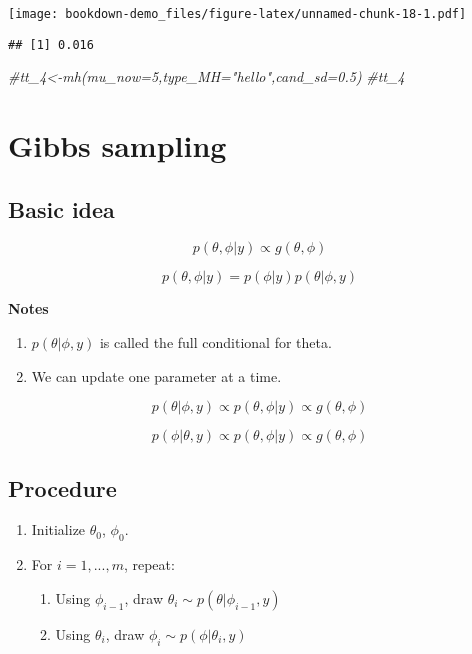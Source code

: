 \documentclass[]{book}
\newenvironment{Shaded}{\begin{snugshade}}{\end{snugshade}}
\newcommand{\DecValTok}[1]{\textcolor[rgb]{0.00,0.00,0.81}{#1}}
\newcommand{\CommentTok}[1]{\textcolor[rgb]{0.56,0.35,0.01}{\textit{#1}}}
\newcommand{\OperatorTok}[1]{\textcolor[rgb]{0.81,0.36,0.00}{\textbf{#1}}}
\newcommand{\NormalTok}[1]{#1}
\providecommand{\tightlist}{%
  \setlength{\itemsep}{0pt}\setlength{\parskip}{0pt}}
\begin{document}
\texttt{[image: bookdown-demo\_files/figure-latex/unnamed-chunk-18-1.pdf]}

\begin{Shaded}
\end{Shaded}

\begin{verbatim}
## [1] 0.016
\end{verbatim}

\begin{Shaded}
\begin{Highlighting}[]
\CommentTok{#tt_4<-mh(mu_now=5,type_MH="hello",cand_sd=0.5)}
\CommentTok{#tt_4}
\end{Highlighting}
\end{Shaded}

\section{Gibbs sampling}\label{gibbs-sampling}

\subsection{Basic idea}\label{basic-idea}

\[p(\theta, \phi|y) \propto g(\theta, \phi)\]

\[p(\theta, \phi|y) = p(\phi |y)p(\theta| \phi,y)\]

\textbf{Notes}

\begin{enumerate}
\def\labelenumi{(\arabic{enumi})}
\item
  \(p(\theta| \phi,y)\) is called the full conditional for theta.
\item
  We can update one parameter at a time.
\end{enumerate}

\[p(\theta| \phi,y) \propto p(\theta, \phi|y) \propto g(\theta, \phi)\]

\[p(\phi| \theta,y) \propto p(\theta, \phi|y) \propto g(\theta, \phi)\]

\subsection{Procedure}\label{procedure-1}

\begin{enumerate}
\def\labelenumi{(\arabic{enumi})}
\item
  Initialize \(\theta_0\), \(\phi_0\).
\item
  For \(i=1,..., m\), repeat:

  \begin{enumerate}
  \def\labelenumii{(\alph{enumii})}
  \tightlist
  \item
    Using \(\phi_{i-1}\), draw \(\theta_i \sim p(\theta|\phi_{i-1},y)\)
  \item
    Using \(\theta_i\), draw \(\phi_i \sim p(\phi|\theta_i,y)\)
  \end{enumerate}
\end{enumerate}
\end{document}
